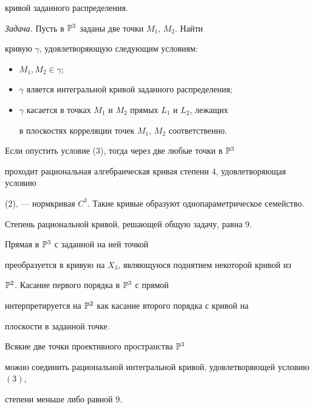 кривой заданного распределения.





{\it Задача.} Пусть в $\Bbb{P}^3$ заданы две точки $M_1$, $M_2$. Найти 


кривую $\gamma$, удовлетворяющую следующим условиям:


\begin{itemize}


\item[(1)] $M_1,M_2\in\gamma$;


\item[(2)] $\gamma$ яляется интегральной кривой заданного распределения;


\item[(3)] $\gamma$ касается в точках $M_1$ и $M_2$ прямых $L_1$ и $L_2$, лежащих 


в плоскостях корреляции точек $M_1$, $M_2$ соответственно.


\end{itemize}





Если опустить условие (3), тогда через две любые точки в $\Bbb{P}^3$ 


проходит рациональная алгебраическая кривая степени 4, удовлетворяющая условию 


(2), --- нормкривая $C^3$. Такие кривые образуют однопараметрическое семейство. 


Степень рациональной кривой, решающей общую задачу, равна 9.





Прямая в $\Bbb{P}^3$ с заданной на ней точкой 


преобразуется в кривую на $X_3$, являющуюся поднятием некоторой кривой из 


$\Bbb{P}^2$. Касание первого порядка в $\Bbb{P}^3$ с прямой 


интерпретируется на $\Bbb{P}^2$ как касание второго порядка с кривой на 


плоскости в заданной точке.   








\begin{thm}


Всякие две точки проективного пространства $\Bbb{P}^3$ 


можно соединить рациональной интегральной кривой, удовлетворяющей условию $(3)$, 


степени меньше либо равной $9$. 


\end{thm}


